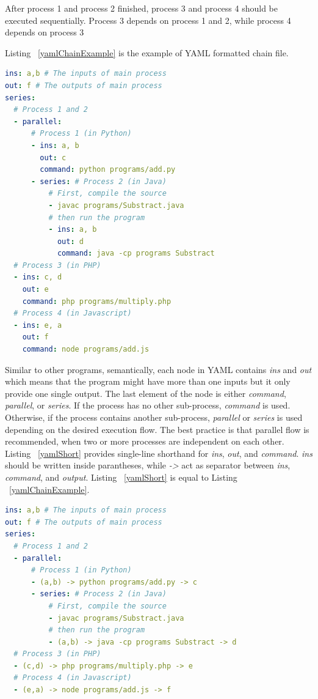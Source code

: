 \documentclass[conference]{IEEEtran}
\begin{document}
After process 1 and process 2 finished, process 3 and process 4 should be executed sequentially. 
Process 3 depends on process 1 and 2, while process 4 depends on process 3

Listing ~\ref{yamlChainExample} is the example of YAML formatted chain file.

\begin{lstlisting}[caption=YAML Chain Example, label=yamlChainExample, language=yaml, basicstyle=\small, breaklines=true]
ins: a,b # The inputs of main process 
out: f # The outputs of main process 
series:
  # Process 1 and 2 
  - parallel:
      # Process 1 (in Python) 
      - ins: a, b
        out: c
        command: python programs/add.py
      - series: # Process 2 (in Java) 
          # First, compile the source  
          - javac programs/Substract.java
          # then run the program 
          - ins: a, b
            out: d
            command: java -cp programs Substract
  # Process 3 (in PHP) 
  - ins: c, d
    out: e
    command: php programs/multiply.php
  # Process 4 (in Javascript) 
  - ins: e, a
    out: f
    command: node programs/add.js
\end{lstlisting}

Similar to other programs, semantically, each node in YAML contains {\it ins} and {\it out } which means that the program might have more than one inputs but it only provide one single output. 
The last element of the node is either {\it command}, {\it parallel}, or {\it series}. 
If the process has no other sub-process, {\it command} is used. Otherwise, if the
process contains another sub-process, {\it parallel} or {\it series} is used depending
on the desired execution flow. The best practice is that parallel flow is recommended, when two or more processes
are independent on each other. Listing  ~\ref{yamlShort} provides single-line shorthand for {\it ins}, {\it out}, 
and {\it command}. {\it ins} should be written inside parantheses, while {\it ->}
act as separator between {\it ins}, {\it command}, and {\it output}. 
Listing  ~\ref{yamlShort} is equal to Listing ~\ref{yamlChainExample}.

\begin{lstlisting}[caption=YAML Chain With Shorthand, label=yamlShort, language=yaml, basicstyle=\small, breaklines=true]
ins: a,b # The inputs of main process 
out: f # The outputs of main process 
series:
  # Process 1 and 2 
  - parallel:
      # Process 1 (in Python) 
      - (a,b) -> python programs/add.py -> c
      - series: # Process 2 (in Java) 
          # First, compile the source  
          - javac programs/Substract.java
          # then run the program 
          - (a,b) -> java -cp programs Substract -> d
  # Process 3 (in PHP) 
  - (c,d) -> php programs/multiply.php -> e
  # Process 4 (in Javascript) 
  - (e,a) -> node programs/add.js -> f
\end{lstlisting}
\end{document}
